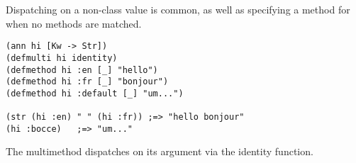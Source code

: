 Dispatching on a non-class value is common, as well as specifying
a  method for when no methods are matched.

\begin{verbatim}
(ann hi [Kw -> Str])
(defmulti hi identity)
(defmethod hi :en [_] "hello")
(defmethod hi :fr [_] "bonjour")
(defmethod hi :default [_] "um...")

(str (hi :en) " " (hi :fr)) ;=> "hello bonjour"
(hi :bocce)   ;=> "um..."
\end{verbatim}

The  multimethod dispatches on its argument via the identity function.

%
%
%

%
%


